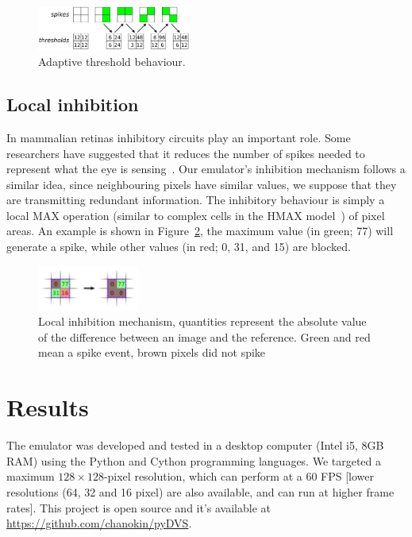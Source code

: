 \documentclass[conference]{IEEEtran}
\begin{document}
%
\begin{figure}[hbt]
  \centering
  \includegraphics[width=0.45\textwidth]{adaptive_thresh_boxes}
  \caption{Adaptive threshold behaviour.}
  \label{fig:adpt_thresh}
\end{figure}

\subsection{Local inhibition} 
In mammalian retinas inhibitory circuits play an important role. Some researchers have suggested that it reduces the number of spikes needed to represent what the eye is sensing~\cite{basab}. Our emulator's inhibition mechanism follows a similar idea, since neighbouring pixels have similar values, we suppose that they are transmitting redundant information. The inhibitory behaviour is simply a local MAX operation (similar to complex cells in the HMAX model~\cite{riesenhuber1999hierarchical}) of pixel areas. An example is shown in Figure~\ref{fig:local_inh}, the maximum value (in green; 77) will generate a spike, while other values (in red; 0, 31, and 15) are blocked.

\begin{figure}[htb]
\centering
    \includegraphics[width=0.3\textwidth]{inh_local_max_img}
    \caption{Local inhibition mechanism, quantities represent the absolute value of the difference between an image and the reference. Green and red mean a spike event, brown pixels did not spike}

  \label{fig:local_inh}
\end{figure}

\section{Results}
\label{sec:results}
The emulator was developed and tested in a desktop computer (Intel i5, 8GB RAM) using the Python and Cython programming languages. We targeted a maximum $128\times 128$-pixel resolution, which can perform at a 60 FPS [lower resolutions (64, 32 and 16 pixel) are also available, and can run at higher frame rates]. This project is open source and it's available at \url{https://github.com/chanokin/pyDVS}.
\end{document}
